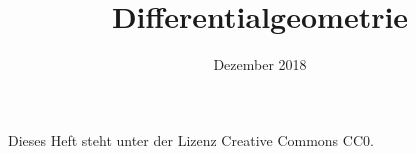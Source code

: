 \documentclass[a4paper,fleqn,11pt]{scrbook}
\title{Differentialgeometrie}
\date{Dezember 2018}
\theoremstyle{rmbox}
\numberwithin{definition}{chapter}
\numberwithin{theorem}{chapter}
\begin{document}
\thispagestyle{empty}

\maketitle

Dieses Heft steht unter der Lizenz Creative Commons CC0.

\tableofcontents






\end{document}

